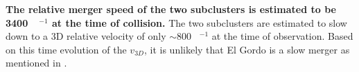 \textbf{The relative merger speed of the two subclusters is estimated to be
3400~\kilo\meter~\second$^{-1}$ at the time of collision.} The two
subclusters are estimated to slow down to a 3D relative velocity of only
$\sim800$ \kilo\meter~\second$^{-1}$  at the time of observation. Based on
this time evolution of the $v_{3D}$, it is unlikely that El Gordo is a slow
merger as mentioned in \citet{M11}. 
